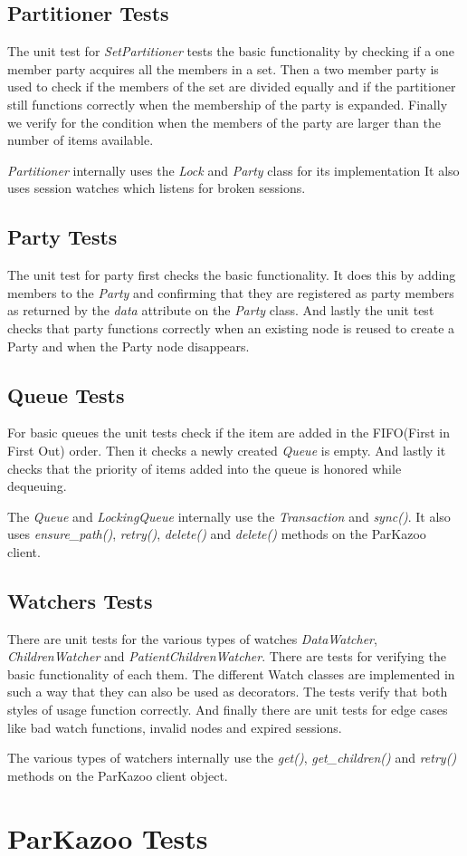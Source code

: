 \subsection{Partitioner Tests}
The unit test for \textit{SetPartitioner} tests the basic functionality by checking if a one member party acquires all the members in a set. Then a two member party is used to check if the members of the set are divided equally and if the partitioner still functions correctly when the membership of the party is expanded. Finally we verify for the condition when the members of the party are larger than the number of items available. 

\textit{Partitioner} internally uses the \textit{Lock} and \textit{Party} class for its implementation It also uses session watches which listens for broken sessions. 

\subsection{Party Tests}
The unit test for party first checks the basic functionality. It does this by adding members to the \textit{Party} and confirming that they are registered as party members as returned by the \textit{data} attribute on the \textit{Party} class. And lastly the unit test checks that party functions correctly when an existing node is reused to create a Party and when the Party node disappears.

\subsection{Queue Tests}
For basic queues the unit tests check if the item are added in the FIFO(First in First Out) order. Then it checks a newly created \textit{Queue} is empty. And lastly it checks that the priority of items added into the queue is honored while dequeuing.

The \textit{Queue} and \textit{LockingQueue} internally use the \textit{Transaction} and \textit{sync()}. It also uses \textit{ensure\_path()}, \textit{retry()}, \textit{delete()} and \textit{delete()} methods on the ParKazoo client.

\subsection{Watchers Tests}
There are unit tests for the various types of watches \textit{DataWatcher}, \textit{ChildrenWatcher} and \textit{PatientChildrenWatcher}. There are tests for verifying the basic functionality of each them. The different Watch classes are implemented in such a way that they can also be used as decorators. The tests verify that both styles of usage function correctly. And finally there are unit tests for edge cases like bad watch functions, invalid nodes and expired sessions.

The various types of watchers internally use the \textit{get()}, \textit{get\_children()} and \textit{retry()} methods on the ParKazoo client object.

\section{ParKazoo Tests}
